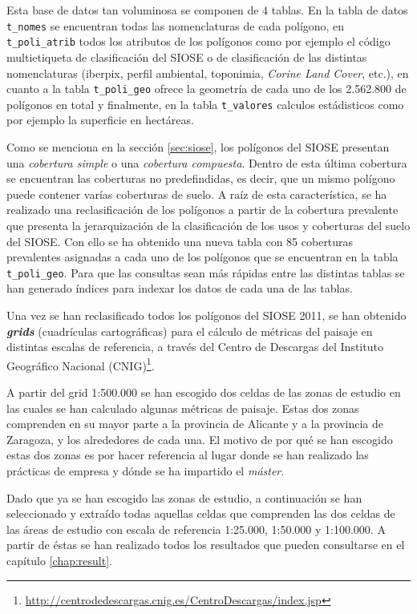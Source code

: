 Esta base de datos tan voluminosa se componen de 4 tablas. En la tabla de datos \texttt{t\_nomes} se encuentran todas las nomenclaturas de cada polígono, en \texttt{t\_poli\_atrib} todos los atributos de los polígonos como por ejemplo el código multietiqueta de clasificación del SIOSE o de clasificación de las distintas nomenclaturas (iberpix, perfil ambiental, toponimia, \textit{Corine Land Cover}, etc.), en cuanto a la tabla \texttt{t\_poli\_geo} ofrece la geometría de cada uno de los 2.562.800 de polígonos en total y finalmente, en la tabla \texttt{t\_valores} calculos estádisticos como por ejemplo la superficie en hectáreas.

Como se menciona en la sección \ref{sec:siose}, los polígonos del SIOSE presentan una \textit{cobertura simple} o una \textit{cobertura compuesta}. Dentro de esta última cobertura se encuentran las coberturas no predefindidas, es decir, que un mismo polígono puede contener varías coberturas de suelo. A raíz de esta característica, se ha realizado una reclasificación de los polígonos a partir de la cobertura prevalente que presenta la jerarquización de la clasificación de los usos y coberturas del suelo del SIOSE. Con ello se ha obtenido una nueva tabla con 85 coberturas prevalentes asignadas a cada uno de los polígonos que se encuentran en la tabla \texttt{t\_poli\_geo}. Para que las consultas sean más rápidas entre las distintas tablas se han generado índices para indexar los datos de cada una de las tablas. 

Una vez se han reclasificado todos los polígonos del SIOSE 2011, se han obtenido \textbf{\textit{grids}} (cuadrículas cartográficas) para el cálculo de métricas del paisaje en distintas escalas de referencia, a través del Centro de Descargas del Instituto Geográfico Nacional (CNIG)\footnote{\url{http://centrodedescargas.cnig.es/CentroDescargas/index.jsp}}. 

A partir del grid 1:500.000 se han escogido dos celdas de las zonas de estudio en las cuales se han calculado algunas métricas de paisaje. Estas dos zonas comprenden en su mayor parte a la provincia de Alicante y a la provincia de Zaragoza, y los alrededores de cada una. El motivo de por qué se han escogido estas dos zonas es por hacer referencia al lugar donde se han realizado las prácticas de empresa y dónde se ha impartido el \textit{máster}.

Dado que ya se han escogido las zonas de estudio, a continuación se han seleccionado y extraído todas aquellas celdas que comprenden las dos celdas de las áreas de estudio con escala de referencia 1:25.000, 1:50.000 y 1:100.000. A partir de éstas se han realizado todos los resultados que pueden consultarse en el capítulo \ref{chap:result}.

